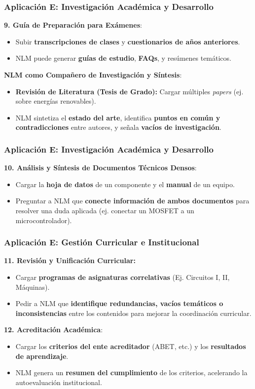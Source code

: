 \documentclass[aspectratio=43]{beamer}
\begin{document}
\begin{frame}
\frametitle{ Aplicación E: Investigación Académica y Desarrollo}
\textbf{9. Guía de Preparación para Exámenes}:
\begin{itemize}
    \item Subir \textbf{transcripciones de clases} y \textbf{cuestionarios de años anteriores}.
    \item NLM puede generar \textbf{guías de estudio}, \textbf{FAQs}, y resúmenes temáticos.
\end{itemize}

\textbf{NLM como Compañero de Investigación y Síntesis}:
\begin{itemize}
    \item \textbf{Revisión de Literatura (Tesis de Grado):} Cargar múltiples \textit{papers} (ej. sobre energías renovables).
    \item NLM sintetiza el \textbf{estado del arte}, identifica \textbf{puntos en común y contradicciones} entre autores, y señala \textbf{vacíos de investigación}.
\end{itemize}
\end{frame}

\begin{frame}
  \frametitle{ Aplicación E: Investigación Académica y Desarrollo}
\textbf{10. Análisis y Síntesis de Documentos Técnicos Densos}:
\begin{itemize}
    \item Cargar la \textbf{hoja de datos} de un componente y el \textbf{manual} de un equipo.
    \item Preguntar a NLM que \textbf{conecte información de ambos documentos} para resolver una duda aplicada (ej. conectar un MOSFET a un microcontrolador).
\end{itemize}
\end{frame}

\begin{frame}
\frametitle{ Aplicación E: Gestión Curricular e Institucional}

\textbf{11. Revisión y Unificación Curricular:} 
\begin{itemize}
    \item Cargar \textbf{programas de asignaturas correlativas} (Ej. Circuitos I, II, Máquinas).
    \item Pedir a NLM que \textbf{identifique redundancias, vacíos temáticos o inconsistencias} entre los contenidos para mejorar la coordinación curricular.
\end{itemize}

\vfill
\textbf{12. Acreditación Académica}:
\begin{itemize}
    \item Cargar los \textbf{criterios del ente acreditador} (ABET, etc.) y los \textbf{resultados de aprendizaje}.
    \item NLM genera un \textbf{resumen del cumplimiento} de los criterios, acelerando la autoevaluación institucional.
\end{itemize}
\end{frame}
\end{document}
